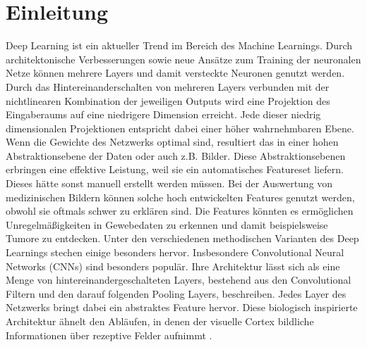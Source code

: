 \documentclass[runningheads,a4paper]{llncs}[2015/06/24]
\begin{document}
\section{Einleitung}\label{sec:intro}
Deep Learning ist ein aktueller Trend im Bereich des Machine Learnings. Durch architektonische Verbesserungen sowie neue Ansätze zum Training der neuronalen Netze können mehrere Layers und damit versteckte Neuronen genutzt werden. Durch das Hintereinanderschalten von mehreren Layers verbunden mit der nichtlinearen Kombination der jeweiligen Outputs wird eine Projektion des Eingaberaums auf eine niedrigere Dimension erreicht. Jede dieser niedrig dimensionalen Projektionen entspricht dabei einer höher wahrnehmbaren Ebene. Wenn die Gewichte des Netzwerks optimal sind, resultiert das in einer hohen Abstraktionsebene der Daten oder auch z.B. Bilder. Diese Abstraktionsebenen erbringen eine effektive Leistung, weil sie ein automatisches Featureset liefern. Dieses hätte sonst manuell erstellt werden müssen. Bei der Auswertung von medizinischen Bildern können solche hoch entwickelten Features genutzt werden, obwohl sie oftmals schwer zu erklären sind. Die Features könnten es ermöglichen Unregelmäßigkeiten in Gewebedaten zu erkennen und damit beispielsweise Tumore zu entdecken. Unter den verschiedenen methodischen Varianten des Deep Learnings stechen einige besonders hervor. Insbesondere Convolutional Neural Networks (CNNs) sind besonders populär. Ihre Architektur lässt sich als eine Menge von hintereinandergeschalteten Layers, bestehend aus den Convolutional Filtern und den darauf folgenden Pooling Layers, beschreiben. Jedes Layer des Netzwerks bringt dabei ein abstraktes Feature hervor. Diese biologisch inspirierte Architektur ähnelt den Abläufen, in denen der visuelle Cortex bildliche Informationen über rezeptive Felder aufnimmt \cite{ravi}.
\end{document}
